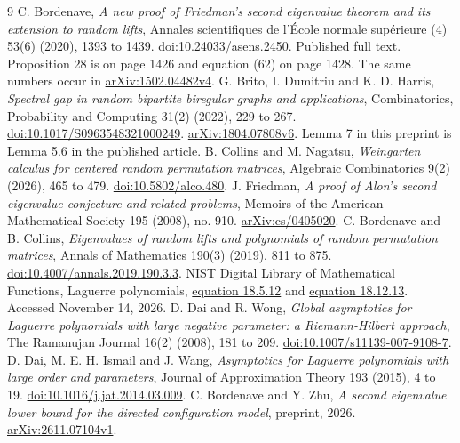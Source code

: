 \documentclass[11pt]{article}
\theoremstyle{definition}
\theoremstyle{remark}
\newcommand{\1}{\mathbf 1}
\begin{document}
\begin{thebibliography}{9}
C. Bordenave, \emph{A new proof of Friedman's second eigenvalue theorem and its extension to random lifts}, Annales scientifiques de l'\'Ecole normale sup\'erieure (4) 53(6) (2020), 1393 to 1439.
\href{https://doi.org/10.24033/asens.2450}{doi:10.24033/asens.2450}.
\href{https://smf.emath.fr/download/pdf/1498332}{Published full text}. Proposition 28 is on page 1426 and equation (62) on page 1428. The same numbers occur in \href{https://arxiv.org/abs/1502.04482v4}{arXiv:1502.04482v4}.
G. Brito, I. Dumitriu and K. D. Harris, \emph{Spectral gap in random bipartite biregular graphs and applications}, Combinatorics, Probability and Computing 31(2) (2022), 229 to 267.
\href{https://doi.org/10.1017/S0963548321000249}{doi:10.1017/S0963548321000249}.
\href{https://arxiv.org/abs/1804.07808v6}{arXiv:1804.07808v6}. Lemma 7 in this preprint is Lemma 5.6 in the published article.
B. Collins and M. Nagatsu, \emph{Weingarten calculus for centered random permutation matrices}, Algebraic Combinatorics 9(2) (2026), 465 to 479.
\href{https://doi.org/10.5802/alco.480}{doi:10.5802/alco.480}.
J. Friedman, \emph{A proof of Alon's second eigenvalue conjecture and related problems}, Memoirs of the American Mathematical Society 195 (2008), no. 910.
\href{https://arxiv.org/abs/cs/0405020}{arXiv:cs/0405020}.
C. Bordenave and B. Collins, \emph{Eigenvalues of random lifts and polynomials of random permutation matrices}, Annals of Mathematics 190(3) (2019), 811 to 875.
\href{https://doi.org/10.4007/annals.2019.190.3.3}{doi:10.4007/annals.2019.190.3.3}.
NIST Digital Library of Mathematical Functions, Laguerre polynomials,
\href{https://dlmf.nist.gov/18.5.E12}{equation 18.5.12} and
\href{https://dlmf.nist.gov/18.12.E13}{equation 18.12.13}. Accessed November 14, 2026.
D. Dai and R. Wong, \emph{Global asymptotics for Laguerre polynomials with large negative parameter: a Riemann-Hilbert approach}, The Ramanujan Journal 16(2) (2008), 181 to 209.
\href{https://doi.org/10.1007/s11139-007-9108-7}{doi:10.1007/s11139-007-9108-7}.
D. Dai, M. E. H. Ismail and J. Wang, \emph{Asymptotics for Laguerre polynomials with large order and parameters}, Journal of Approximation Theory 193 (2015), 4 to 19.
\href{https://doi.org/10.1016/j.jat.2014.03.009}{doi:10.1016/j.jat.2014.03.009}.
C. Bordenave and Y. Zhu, \emph{A second eigenvalue lower bound for the directed configuration model}, preprint, 2026.
\href{https://arxiv.org/abs/2611.07104v1}{arXiv:2611.07104v1}.
\end{thebibliography}
\end{document}

